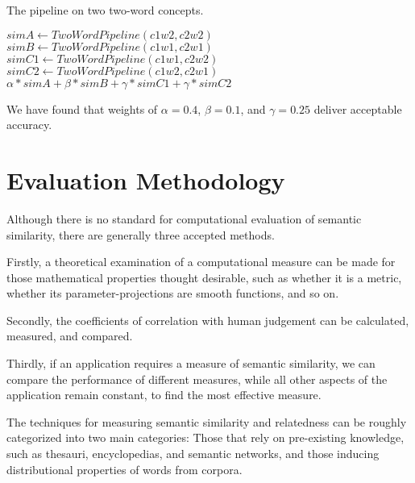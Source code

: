 \documentclass{article}
\begin{document}
\begin{algorithm}
\caption{The pipeline on two two-word concepts.}\label{al:twocompoundpipeline}
\begin{algorithmic}[1]
		\State $\textit{simA} \gets \textit{TwoWordPipeline}(c1w2, c2w2)$
		\State $\textit{simB} \gets \textit{TwoWordPipeline}(c1w1, c2w1)$
		\State $\textit{simC1} \gets \textit{TwoWordPipeline}(c1w1, c2w2)$
		\State $\textit{simC2} \gets \textit{TwoWordPipeline}(c1w2, c2w1)$
		\State \Return $\alpha * \textit{simA} + \beta * \textit{simB} + \gamma * \textit{simC1} + \gamma * \textit{simC2}$
	\EndProcedure
\end{algorithmic}
\end{algorithm}

We have found that weights of $\alpha = 0.4$, $\beta = 0.1$, and $\gamma = 0.25$ deliver acceptable accuracy.

\section{Evaluation Methodology}

Although there is no standard for computational evaluation of semantic similarity, there are generally three accepted methods\cite{meng2013review}.

Firstly, a theoretical examination of a computational measure can be made for those mathematical properties thought desirable, such as whether it is a metric, whether its parameter-projections are smooth functions, and so on. %

Secondly, the coefficients of correlation with human judgement can be calculated, measured, and compared\cite{zhou2008new,seco2004intrinsic}.

Thirdly, if an application requires a measure of semantic similarity, we can compare the performance of different measures, while all other aspects of the application remain constant, to find the most effective measure\cite{blanchard2006tree,budanitsky2006evaluating}. %

The techniques for measuring semantic similarity and relatedness can be roughly categorized into two main categories\cite{agirre2009study}: Those that rely on pre-existing knowledge, such as thesauri, encyclopedias, and semantic networks\cite{alvarez2007graph,yang2005measuring,hughes2007lexical}, and those inducing distributional properties of words from corpora\cite{sahami2006web,chen2006novel,bollegala2007measuring}.
\end{document}
